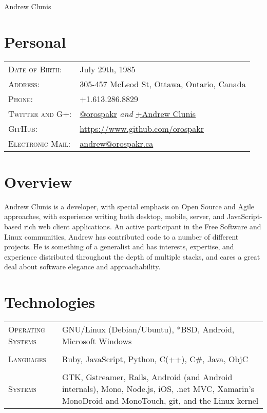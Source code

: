 \documentclass[letterpaper,10pt]{article}
\begin{document}
\pagestyle{empty} %

\par{\centering
{\Huge Andrew \textsc Clunis
}\bigskip\par}

\section{Personal}
\begin{longtable}{p{3cm}|p{12cm}}
  \textsc{Date of Birth:} & July 29th, 1985 \\
  \textsc{Address:} & 305-457 McLeod St, Ottawa, Ontario, Canada \\
  \textsc{Phone:} & +1.613.286.8829 \\
  \textsc{Twitter and G+:} & \href{http://twitter.com/orospakr}{@orospakr} \emph{and} \href{https://plus.google.com/101728978406554574081}{+Andrew Clunis}\\
  \textsc{GitHub:} & \href{https://github.com/orospakr}{https://www.github.com/orospakr} \\
  \textsc{Electronic Mail:} & \href{mailto:andrew@orospakr.ca}{andrew@orospakr.ca} \\
\end{longtable}

\section{Overview}
Andrew Clunis is a developer, with special emphasis on Open Source and
Agile approaches, with experience writing both desktop, mobile,
server, and JavaScript-based rich web client applications.  An active
participant in the Free Software and Linux communities, Andrew has
contributed code to a number of different projects.  He is something
of a generalist and has interests, expertise, and experience
distributed throughout the depth of multiple stacks, and cares a great
deal about software elegance and \mbox{approachability}.

\section{Technologies}
\begin{longtable}{p{3cm}|p{12cm}}
  \textsc{Operating Systems} & GNU/Linux (Debian/Ubuntu), *BSD, Android, Microsoft Windows\\
  \multicolumn{2}{c}{} \\
  \textsc{Languages} & Ruby, JavaScript, Python, C(++), C\#, Java, ObjC \\
  \multicolumn{2}{c}{} \\
  \textsc{Systems} & GTK, Gstreamer, Rails, Android (and Android internals), Mono, Node.js, iOS, .net MVC, Xamarin's MonoDroid and MonoTouch, git, and the Linux kernel
\end{longtable}
\end{document}
